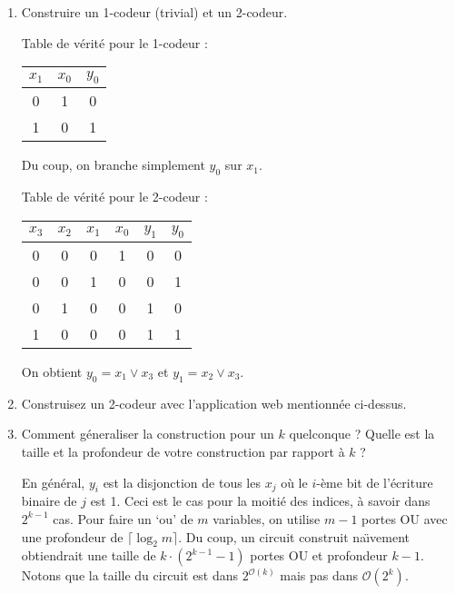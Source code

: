 \documentclass[11pt]{article}
\begin{document}
\begin{enumerate}
 \item Construire un 1-codeur (trivial) et un 2-codeur.

\begin{solution}

 Table de vérité pour le 1-codeur :
 \begin{tabular}{|cc|c|}
  \hline
  $x_1$ & $x_0$ & $y_0$ \\
  \hline
  0 & 1 & 0 \\
  1 & 0 & 1 \\
  \hline
 \end{tabular}

 Du coup, on branche simplement $y_0$ sur $x_1$.

\bigskip

 Table de vérité pour le 2-codeur : 
 \begin{tabular}{|cccc|cc|}
  \hline
  $x_3$ & $x_2$ & $x_1$ & $x_0$ & $y_1$ & $y_0$ \\
  \hline
  0 & 0 & 0 & 1 & 0 & 0 \\
  0 & 0 & 1 & 0 & 0 & 1 \\
  0 & 1 & 0 & 0 & 1 & 0 \\
  1 & 0 & 0 & 0 & 1 & 1 \\
  \hline
 \end{tabular}

 On obtient $y_0 = x_1\lor x_3$ et $y_1=x_2\lor x_3$.
\end{solution}

 \item Construisez un 2-codeur avec l'application web mentionnée ci-dessus.

 \item Comment géneraliser la construction pour un $k$ quelconque ?
	Quelle est la taille et la profondeur de votre construction
	par rapport à $k$ ?

\begin{solution}
En général, $y_i$ est la disjonction de tous les $x_j$ où le $i$-ème
bit de l'écriture binaire de $j$ est 1. Ceci est le cas pour la moitié
des indices, à savoir dans $2^{k-1}$ cas. Pour faire un `ou' de $m$
variables, on utilise $m-1$ portes OU avec une profondeur de
$\lceil \log_2m\rceil$. Du coup, un circuit construit na\"\i{}vement
obtiendrait une taille de $k\cdot (2^{k-1}-1)$ portes OU et profondeur $k-1$.
Notons que la taille du circuit est dans $2^{\mathcal{O}(k)}$ mais pas
dans $\mathcal{O}(2^k)$.


\end{solution}
\end{enumerate}
\end{document}
